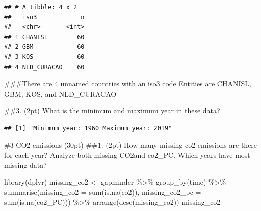 \documentclass[
]{article}
\newenvironment{Shaded}{\begin{snugshade}}{\end{snugshade}}
\newcommand{\AttributeTok}[1]{\textcolor[rgb]{0.77,0.63,0.00}{#1}}
\newcommand{\ConstantTok}[1]{\textcolor[rgb]{0.00,0.00,0.00}{#1}}
\newcommand{\FunctionTok}[1]{\textcolor[rgb]{0.00,0.00,0.00}{#1}}
\newcommand{\NormalTok}[1]{#1}
\newcommand{\OtherTok}[1]{\textcolor[rgb]{0.56,0.35,0.01}{#1}}
\newcommand{\SpecialCharTok}[1]{\textcolor[rgb]{0.00,0.00,0.00}{#1}}
\newcommand{\StringTok}[1]{\textcolor[rgb]{0.31,0.60,0.02}{#1}}
\begin{document}
\begin{verbatim}
## # A tibble: 4 x 2
##   iso3            n
##   <chr>       <int>
## 1 CHANISL        60
## 2 GBM            60
## 3 KOS            60
## 4 NLD_CURACAO    60
\end{verbatim}

\#\#\#There are 4 unnamed countries with an iso3 code Entities are
CHANISL, GBM, KOS, and NLD\_CURACAO

\#\#3. (2pt) What is the minimum and maximum year in these data?

\begin{Shaded}
\end{Shaded}

\begin{verbatim}
## [1] "Minimum year: 1960 Maximum year: 2019"
\end{verbatim}

\#3 CO2 emissions (30pt) \#\#1. (2pt) How many missing co2 emissions are
there for each year? Analyze both missing CO2and co2\_PC. Which years
have most missing data?

\begin{Shaded}
\begin{Highlighting}[]
\FunctionTok{library}\NormalTok{(dplyr)}
\NormalTok{missing\_co2 }\OtherTok{\textless{}{-}}\NormalTok{ gapminder }\SpecialCharTok{\%\textgreater{}\%} 
  \FunctionTok{group\_by}\NormalTok{(time) }\SpecialCharTok{\%\textgreater{}\%} 
  \FunctionTok{summarise}\NormalTok{(}\AttributeTok{missing\_co2 =} \FunctionTok{sum}\NormalTok{(}\FunctionTok{is.na}\NormalTok{(co2)), }\AttributeTok{missing\_co2\_pc =}   \FunctionTok{sum}\NormalTok{(}\FunctionTok{is.na}\NormalTok{(co2\_PC))) }\SpecialCharTok{\%\textgreater{}\%} 
  \FunctionTok{arrange}\NormalTok{(}\FunctionTok{desc}\NormalTok{(missing\_co2))}
\NormalTok{missing\_co2}
\end{Highlighting}
\end{Shaded}
\end{document}
